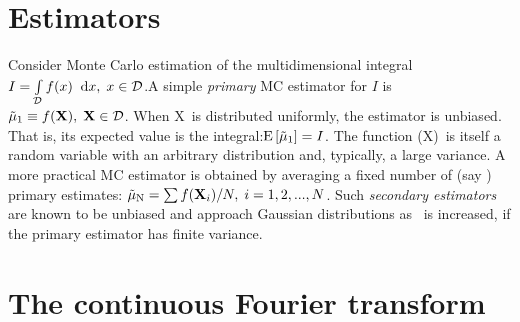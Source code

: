 \section{Estimators}
Consider Monte Carlo estimation of the multidimensional integral $ I = \int\limits_{\mathcal{D}}^{} f(x) \;\; \mathrm{d}x, \; x\in\mathcal{D} $.A simple \emph{primary} MC estimator for $I$ is
$\tilde\mu_\mathrm{1}\equiv f(\mathbf{X}) , \;\mathbf{X} \in \mathcal{D}$. When \RV X\ is distributed
uniformly, the estimator is unbiased. That is, its expected value is the integral:$\mathrm{E} \left[\tilde\mu_\mathrm{1} \right]=I$. The function \ifsym(\RV X)\ is itself a random variable with an arbitrary distribution and, typically, a large variance. A more practical MC estimator is obtained by averaging a fixed number of (say \N) primary estimates:  $\tilde\mu_\mathrm{N} = \sum f(\mathbf{X} _i)/N, \; i=1,2,...,N$. Such \emph{secondary estimators}  are known to be unbiased and approach Gaussian distributions as \N\ is increased, if the primary estimator has finite variance. 


\section{The continuous Fourier transform}

